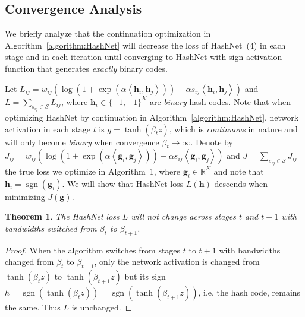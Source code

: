 \documentclass[10pt,twocolumn,letterpaper]{article}
\newtheorem{theorem}{Theorem}
\begin{document}
\subsection{Convergence Analysis}
We briefly analyze that the continuation optimization in Algorithm~\ref{algorithm:HashNet} will decrease the loss of HashNet~(4) in each stage and in each iteration until converging to HashNet with sign activation function that generates \emph{exactly} binary codes.

Let $L_{ij} = {{w_{ij}}\left( {\log \left( {1 + \exp \left( {\alpha \left\langle {{{\bm{h}}_i},{{\bm{h}}_j}} \right\rangle } \right)} \right) - \alpha {s_{ij}}\left\langle {{{\bm{h}}_i},{{\bm{h}}_j}} \right\rangle } \right)}$ and $L = \sum\nolimits_{{s_{ij}} \in \mathcal{S}} L_{ij}$, where ${\bm h}_i \in \{-1,+1\}^K$ are \emph{binary} hash codes. 
Note that when optimizing HashNet by continuation in Algorithm~\ref{algorithm:HashNet}, network activation in each stage $t$ is $g = \tanh(\beta_t z)$, which is \emph{continuous} in nature and will only become \emph{binary} when convergence ${\beta _t} \to \infty $. Denote by $J_{ij} = {{w_{ij}}\left( {\log \left( {1 + \exp \left( {\alpha \left\langle {{{\bm{g}}_i},{{\bm{g}}_j}} \right\rangle } \right)} \right) - \alpha {s_{ij}}\left\langle {{{\bm{g}}_i},{{\bm{g}}_j}} \right\rangle } \right)}$ and $J = \sum\nolimits_{{s_{ij}} \in \mathcal{S}} J_{ij}$ the true loss we optimize in Algorithm~1, where ${\bm g}_i \in \mathbb{R}^K$ and note that ${\bm h}_i = \operatorname{sgn}({\bm g}_i)$. We will show that HashNet loss $L({\bm h})$ descends when minimizing $J({\bm g})$.

\begin{theorem}\label{the:stage}
The HashNet loss $L$ will not change across stages $t$ and $t+1$ with bandwidths switched from $\beta_t$ to $\beta_{t+1}$.
\end{theorem}
\begin{proof}
When the algorithm switches from stages $t$ to $t+1$ with bandwidths changed from $\beta_t$ to $\beta_{t+1}$, only the network activation is changed from $\operatorname{tanh}(\beta_t z)$  to $\operatorname{tanh}(\beta_{t+1} z)$ but its sign $h = \operatorname{sgn}(\operatorname{tanh}(\beta_t z)) =  \operatorname{sgn}(\operatorname{tanh}(\beta_{t+1} z))$, i.e. the hash code, remains the same. Thus $L$ is unchanged.
\end{proof}
\end{document}
